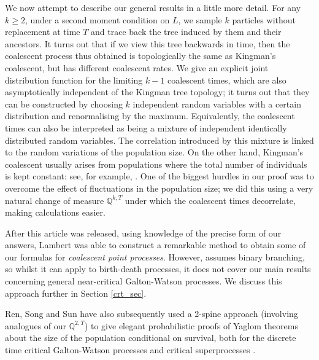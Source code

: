\documentclass{article}
\theoremstyle{plain}
\theoremstyle{definition}
\newcommand{\Q}{\mathbb{Q}}
\begin{document}
We now attempt to describe our general results in a little more detail. For any $k\ge 2$, under a second moment condition on $L$, we sample $k$ particles without replacement at time $T$ and trace back the tree induced by them and their ancestors. It turns out that if we view this tree backwards in time, then the coalescent process thus obtained is topologically the same as Kingman's coalescent, but has different coalescent rates. We give an explicit joint distribution function for the limiting $k-1$ coalescent times, which are also asymptotically independent of the Kingman tree topology; it turns out that they can be constructed by choosing $k$ independent random variables with a certain distribution and renormalising by the maximum. Equivalently, the coalescent times can also be interpreted as being a mixture of independent identically distributed random variables. The correlation introduced by this mixture is linked to the random variations of the population size. On the other hand, Kingman's coalescent usually arises from populations where the total number of individuals is kept constant: see, for example, \cite{schweinsberg2003coalescent}. One of the biggest hurdles in our proof was to overcome the effect of fluctuations in the population size; we did this using a very natural change of measure $\Q^{k,T}$ under which the coalescent times decorrelate, making calculations easier.



After this article was released, using knowledge of the precise form of our answers,  Lambert  \cite{lambert:genealogy_binary} was able to construct a remarkable method to obtain some of our formulas for \emph{coalescent point processes}. However, \cite{lambert:genealogy_binary} assumes binary branching, so whilst it can apply to birth-death processes, it does not cover our main results concerning general near-critical Galton-Watson processes. We discuss this approach further in Section \ref{crt_sec}.  


Ren, Song and Sun \cite{ren_song_sun:2spinesuperprocess, ren_song_sun:2spineGW} have also subsequently used a 2-spine approach (involving analogues of our $\Q^{2,T}$) to give elegant probabilistic proofs of Yaglom theorems about the size of the population conditional on survival, both for the discrete time critical Galton-Watson processes \cite{ren_song_sun:2spineGW} and critical superprocesses \cite{ren_song_sun:2spinesuperprocess}. 
\end{document}
